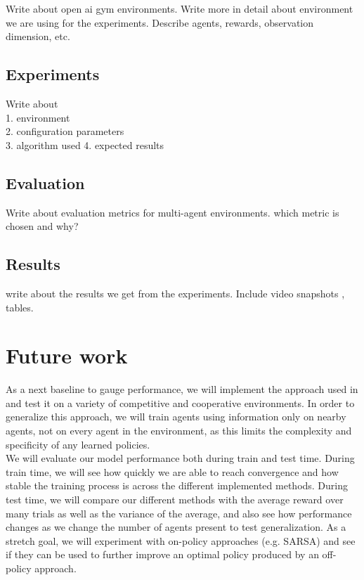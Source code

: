 \documentclass{article}
\begin{document}
Write about open ai gym environments. Write more in detail about environment we are using for the experiments. Describe agents, rewards, observation dimension, etc. 

\subsection{Experiments}

Write about \\
1. environment \\
2. configuration parameters \\
3. algorithm used
4. expected results

\subsection{Evaluation}

Write about evaluation metrics for multi-agent environments.
which metric is chosen and why? 

\subsection{Results}

write about the results we get from the experiments.
Include video snapshots , tables.

\section{Future work}

As a next baseline to gauge performance, we will implement the approach used in \cite{maddpg} and test it on a variety of competitive and cooperative environments. In order to generalize this approach, we will train agents using information only on nearby agents, not on every agent in the environment, as this limits the complexity and specificity of any learned policies. \\

We will evaluate our model performance both during train and test time. During train time, we will see how quickly we are able to reach convergence and how stable the training process is across the different implemented methods. During test time, we will compare our different methods with the average reward over many trials as well as the variance of the average, and also see how performance changes as we change the number of agents present to test generalization.
As a stretch goal, we will experiment with on-policy approaches (e.g. SARSA) and see if they can be used to further improve an optimal policy produced by an off-policy approach.



\end{document}
